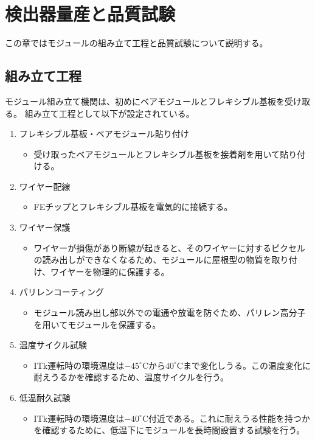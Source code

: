 \chapter{検出器量産と品質試験}
この章ではモジュールの組み立て工程と品質試験について説明する。

\section{組み立て工程}
モジュール組み立て機関は、初めにベアモジュールとフレキシブル基板を受け取る。
組み立て工程として以下が設定されている。
\begin{enumerate}
  \item フレキシブル基板・ベアモジュール貼り付け
  \begin{itemize}
    \item 受け取ったベアモジュールとフレキシブル基板を接着剤を用いて貼り付ける。
  \end{itemize}
  \item ワイヤー配線
  \begin{itemize}
    \item FEチップとフレキシブル基板を電気的に接続する。
  \end{itemize}
  \item ワイヤー保護
  \begin{itemize}
    \item ワイヤーが損傷があり断線が起きると、そのワイヤーに対するピクセルの読み出しができなくなるため、モジュールに屋根型の物質を取り付け、ワイヤーを物理的に保護する。
  \end{itemize}
  \item パリレンコーティング
  \begin{itemize}
    \item モジュール読み出し部以外での電通や放電を防ぐため、パリレン高分子を用いてモジュールを保護する。
  \end{itemize}
  \item 温度サイクル試験
  \begin{itemize}
    \item ITk運転時の環境温度は$-45^\circ$Cから$40^\circ$Cまで変化しうる\cite{3-2}。この温度変化に耐えうるかを確認するため、温度サイクルを行う。
  \end{itemize}
  \item 低温耐久試験
  \begin{itemize}
    \item ITk運転時の環境温度は$-40^\circ$C付近である。これに耐えうる性能を持つかを確認するために、低温下にモジュールを長時間設置する試験を行う。
  \end{itemize}
\end{enumerate}

